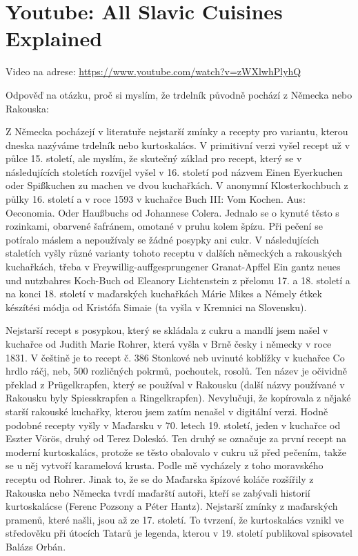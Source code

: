 
\section{Youtube: All Slavic Cuisines Explained}

Video na adrese: \url{https://www.youtube.com/watch?v=zWXlwhPlyhQ}


Odpověď na otázku, proč si myslím, že trdelník původně pochází z Německa nebo Rakouska:

Z Německa pocházejí v literatuře nejstarší zmínky a recepty pro variantu, kterou dneska nazýváme trdelník nebo kurtoskalács. V primitivní verzi vyšel recept už v půlce 15. století, ale myslím, že skutečný základ pro recept, který se v následujících stoletích rozvíjel vyšel v 16. století pod názvem Einen Eyerkuchen oder Spißkuchen zu machen ve dvou kuchařkách. V anonymní Klosterkochbuch z půlky 16. století a v roce 1593 v kuchařce Buch III: Vom Kochen. Aus: Oeconomia. Oder Haußbuchs od Johannese Colera. Jednalo se o kynuté těsto s rozinkami, obarvené šafránem, omotané v pruhu kolem špízu. Při pečení se potíralo máslem a nepoužívaly se žádné posypky ani cukr. V následujících staletích vyšly různé varianty tohoto receptu v dalších německých a rakouských kuchařkách, třeba v Freywillig-auffgesprungener Granat-Apffel Ein gantz neues und nutzbahres Koch-Buch od Eleanory Lichtenstein z přelomu 17. a 18. století a na konci 18. století v maďarských kuchařkách  Márie Mikes a Némely étkek készítési módja od Kristófa Simaie (ta vyšla v Kremnici na Slovensku).

Nejstarší recept s posypkou, který se skládala z cukru a mandlí jsem našel v kuchařce od Judith Marie Rohrer, která vyšla v Brně česky i německy v roce 1831. V češtině je to recept č. 386 Stonkové neb uvinuté koblížky v kuchařce Co hrdlo ráčj, neb, 500 rozličných pokrmů, pochoutek, rosolů. Ten název je očividně překlad z Prügelkrapfen, který se používal v Rakousku (další názvy používané v Rakousku byly Spiesskrapfen a Ringelkrapfen). Nevylučuji, že kopírovala z nějaké starší rakouské kuchařky, kterou jsem zatím nenašel v digitální verzi. Hodně podobné recepty vyšly v Maďarsku v 70. letech 19. století, jeden v kuchařce od Eszter Vörös, druhý od Terez Doleskó. Ten druhý se označuje za první recept na moderní kurtoskalács, protože se těsto obalovalo v cukru už před pečením, takže se u něj vytvoří karamelová krusta. Podle mě vycházely z toho moravského receptu od Rohrer. Jinak to, že se do Maďarska špízové koláče rozšířily z Rakouska nebo Německa tvrdí maďarští autoři, kteří se zabývali historií kurtoskalácse (Ferenc Pozsony a Péter Hantz). Nejstarší zmínky z maďarských pramenů, které našli, jsou až ze 17. století. To tvrzení, že kurtoskalács vznikl ve středověku při útocích Tatarů je legenda, kterou v 19. století publikoval spisovatel Balázs Orbán. 


